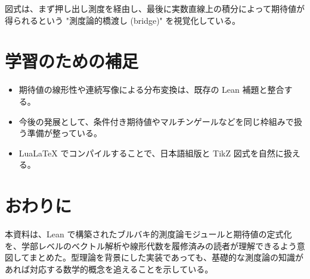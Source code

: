 \documentclass[a4paper]{ltjsarticle}
\DeclareMathOperator{\E}{\mathbb{E}}
\begin{document}
\begin{center}
\end{center}

図式は、まず押し出し測度を経由し、最後に実数直線上の積分によって期待値が得られるという "測度論的橋渡し (bridge)" を視覚化している。

\section{学習のための補足}
\begin{itemize}
  \item 期待値の線形性や連続写像による分布変換は、既存の Lean 補題と整合する。
  \item 今後の発展として、条件付き期待値やマルチンゲールなどを同じ枠組みで扱う準備が整っている。
  \item Lua\LaTeX{} でコンパイルすることで、日本語組版と TikZ 図式を自然に扱える。
\end{itemize}

\section*{おわりに}
本資料は、Lean で構築されたブルバキ的測度論モジュールと期待値の定式化を、学部レベルのベクトル解析や線形代数を履修済みの読者が理解できるよう意図してまとめた。型理論を背景にした実装であっても、基礎的な測度論の知識があれば対応する数学的概念を追えることを示している。
\end{document}
